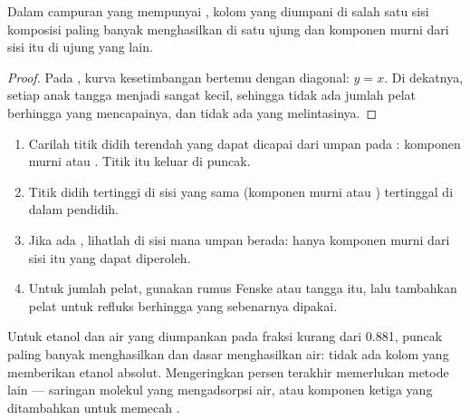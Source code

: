 \begin{proposition}\label{prop:b2:liquid-vapour-diagrams:azeotrope-limit}
Dalam campuran yang mempunyai , kolom yang diumpani di salah satu
sisi komposisi  paling banyak menghasilkan  di satu ujung
dan komponen murni dari sisi itu di ujung yang lain.
\end{proposition}

\begin{proof}
Pada , kurva kesetimbangan bertemu dengan diagonal: $y = x$. Di
dekatnya, setiap anak tangga menjadi sangat kecil, sehingga tidak ada
jumlah pelat berhingga yang mencapainya, dan tidak ada yang melintasinya.
\end{proof}

\begin{method}\label{met:b2:liquid-vapour-diagrams:predict-distillation}
\begin{enumerate}
  \item Carilah titik didih terendah yang dapat dicapai dari umpan pada
        : komponen murni atau . Titik itu
        keluar di puncak.
  \item Titik didih tertinggi di sisi yang sama (komponen murni atau
        ) tertinggal di dalam pendidih.
  \item Jika ada , lihatlah di sisi mana umpan berada: hanya
        komponen murni dari sisi itu yang dapat diperoleh.
  \item Untuk jumlah pelat, gunakan rumus Fenske atau tangga itu, lalu
        tambahkan pelat untuk refluks berhingga yang sebenarnya dipakai.
\end{enumerate}
\end{method}

Untuk etanol dan air yang diumpankan pada fraksi kurang dari 0.881, puncak
paling banyak menghasilkan  dan dasar menghasilkan air: tidak ada
kolom yang memberikan etanol absolut. Mengeringkan persen terakhir
memerlukan metode lain --- saringan molekul yang mengadsorpsi air, atau
komponen ketiga yang ditambahkan untuk memecah .

